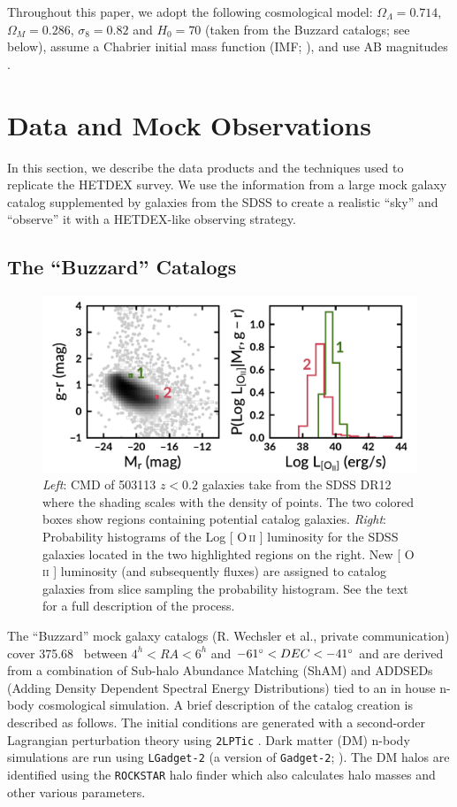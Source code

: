 \documentclass[fleqn,usenatbib]{mnras}
\makeatletter
\DeclareRobustCommand{\ion}[2]{%
\relax\ifmmode
\ifx\testbx\f@series
{\mathbf{#1\,\mathsc{#2}}}\else
{\mathrm{#1\,\mathsc{#2}}}\fi
\else\textup{#1\,{\mdseries\textsc{#2}}}%
\fi}
\makeatother
\begin{document}
Throughout this paper, we adopt the following cosmological model: $\Omega_\Lambda = 0.714$,
$\Omega_M = 0.286$, $\sigma_8 = 0.82$ and $H_0= 70$ \kms \mpc (taken from the Buzzard catalogs; see below), assume a Chabrier initial mass function (IMF; \citealt{Chabrier2003}), and use AB magnitudes \citep{Oke1974}.

\section{Data and Mock Observations}\label{sec:Data}
In this section, we describe the data products and the techniques used to replicate the HETDEX survey. We use the information from a large mock galaxy catalog supplemented by galaxies from the SDSS to create a realistic ``sky'' and ``observe'' it with a HETDEX-like observing strategy.

\subsection{The ``Buzzard'' Catalogs}
\begin{figure} 
	\includegraphics[width=\textwidth]{figures/oii_sdss.pdf} 
	\caption{\textit{Left}: CMD of 503113 $z<0.2$ galaxies take from the SDSS DR12 where the shading scales with the density of points. The two colored boxes show regions containing potential catalog galaxies. \textit{Right}: Probability histograms of the Log [\ion{O}{ii}] luminosity for the SDSS galaxies located in the two highlighted regions on the right. New [\ion{O}{ii}] luminosity (and subsequently fluxes) are assigned to catalog galaxies from slice sampling the probability histogram. See the text for a full description of the process.} \label{fig: oii sdss} 
\end{figure}

The ``Buzzard'' mock galaxy catalogs (R. Wechsler et al., private communication) cover 375.68 \degsq\ between $4^h< RA < 6^h$ and $-61\hbox{$^\circ$} < DEC < -41\hbox{$^\circ$}$ and are derived from a combination of Sub-halo Abundance Matching (ShAM) and ADDSEDs (Adding Density Dependent Spectral Energy Distributions) tied to an in house n-body cosmological simulation. A brief description of the catalog creation is described as follows. The initial conditions are generated with a second-order Lagrangian perturbation theory using {\tt 2LPTic} \citep{Crocce2006}. Dark matter (DM) n-body simulations are run using {\tt LGadget-2} (a version of {\tt Gadget-2}; \citealt{Springel2005}). The DM halos are identified using the {\tt ROCKSTAR} halo finder \citep{Behroozi2013} which also calculates halo masses and other various parameters. 
\end{document}
